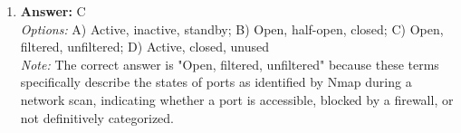 \documentclass[12pt]{article}
\begin{document}
\begin{enumerate}[label=\arabic*.]
\\ \textit{Note:} A hash function provides a unique fixed-size output for a given input, allowing any alteration of the message to result in a different hash value, thereby ensuring the integrity of the message by detecting changes.
\item \textbf{Answer:} C
\\ \textit{Options:} A) Active, inactive, standby; B) Open, half-open, closed; C) Open, filtered, unfiltered; D) Active, closed, unused
\\ \textit{Note:} The correct answer is "Open, filtered, unfiltered" because these terms specifically describe the states of ports as identified by Nmap during a network scan, indicating whether a port is accessible, blocked by a firewall, or not definitively categorized.
\end{enumerate}
\end{document}
